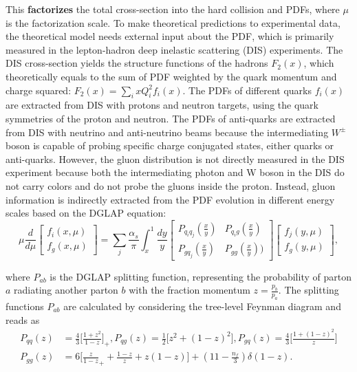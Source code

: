 \noindent This \textbf{factorizes} the total cross-section into the hard collision and PDFs, where $\mu$ is the factorization scale. To make theoretical predictions to experimental data, the theoretical model needs external input about the PDF, which is primarily measured in the lepton-hadron deep inelastic scattering (DIS) experiments. The DIS cross-section yields the structure functions of the hadrons $F_2(x)$, which theoretically equals to the sum of PDF weighted by the quark momentum and charge squared: $F_2(x) = \sum_i x Q^2_i f_i(x)$. The PDFs of different quarks $f_i(x)$ are extracted from DIS with protons and neutron targets, using the quark symmetries of the proton and neutron. The PDFs of anti-quarks are extracted from DIS with neutrino and anti-neutrino beams because the intermediating $W^\pm$ boson is capable of probing specific charge conjugated states, either quarks or anti-quarks. However, the gluon distribution is not directly measured in the DIS experiment because both the intermediating photon and W boson in the DIS do not carry colors and do not probe the gluons inside the proton. Instead, gluon information is indirectly extracted from the PDF evolution in different energy scales based on the DGLAP equation:
\begin{equation}
    \mu \frac{d}{d\mu} \begin{bmatrix} f_i(x,\mu) \\ f_g(x,\mu) \end{bmatrix} = 
    \sum_j \frac{\alpha_s}{\pi} \int_x^1 
    \frac{dy}{y}
    \begin{bmatrix} P_{q_i q_j}(\frac{x}{y}) & P_{q_i g}(\frac{x}{y}) \\ P_{g q_j}(\frac{x}{y}) & P_{gg}(\frac{x}{y})) \end{bmatrix} \begin{bmatrix} f_j(y,\mu) \\ f_g(y,\mu) \end{bmatrix} ,
    \label{eqn:relatedWorks:qft:ppCollision:dglap}
\end{equation}

\noindent where $P_{ab}$ is the DGLAP splitting function, representing the probability of parton $a$ radiating another parton $b$ with the fraction momentum $z=\frac{p_b}{p_a}$. The splitting  functions $P_{ab}$ are calculated by considering the tree-level Feynman diagram and reads as
\begin{equation}
\begin{split}
	P_{qq}(z) &= \frac{4}{3}\bigg[\frac{1+z^2}{1-z} \bigg]_+, P_{qg}(z)=\frac{1}{2} \bigg[z^2+(1-z)^2 \bigg], P_{gq}(z)=\frac{4}{3}\bigg[\frac{1+(1-z)^2}{z} \bigg]\\
    P_{gg}(z) &= 6 \bigg[ \frac{z}{1-z}_+ + \frac{1-z}{z} + z(1-z) \bigg] +(11-\frac{n_f}{3})\delta(1-z) .
\end{split}
\label{eqn:relatedWorks:qft:ppCollision:splitting}
\end{equation}

